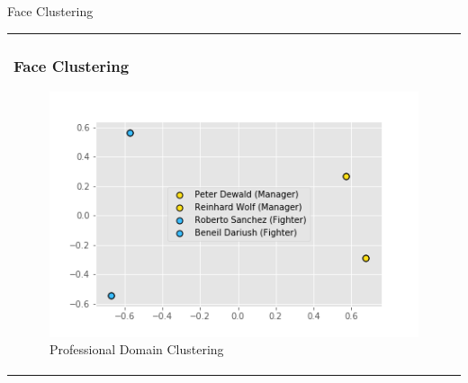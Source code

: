 \documentclass[11pt]{beamer}
\begin{document}
\begin{frame}{Face Clustering}
\begin{tabular}{l}
\parbox{1\linewidth}{
\frametitle{Face Clustering}
\begin{figure}[!tbp]
  \centering
  \begin{minipage}[b]{0.8\textwidth}
    \includegraphics[width=\textwidth]{figures/plot.png}
    \caption{Professional Domain Clustering \cite{trigueros}}
    \label{fig:landmark}
  \end{minipage}
\end{figure}
}
\end{tabular}  
\end{frame}
\end{document}
